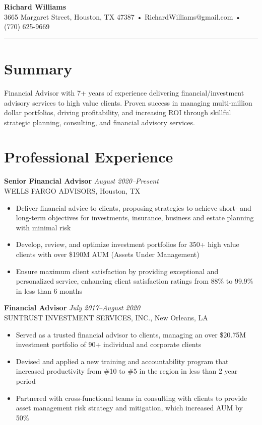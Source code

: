 \documentclass[11pt,letterpaper]{article}
\newcommand{\header}[1]{\textbf{\color{headercolor}#1}}
\begin{document}
\begin{center}
{\fontsize{24}{28}\selectfont\bfseries\color{headercolor} Richard Williams}\\[0.5em]
3665 Margaret Street, Houston, TX 47387 • RichardWilliams@gmail.com • (770) 625-9669
\end{center}
\noindent\rule{\textwidth}{2pt}
\section*{Summary}
Financial Advisor with 7+ years of experience delivering financial/investment advisory services to high value clients. Proven success in managing multi-million dollar portfolios, driving profitability, and increasing ROI through skillful strategic planning, consulting, and financial advisory services.
\section*{Professional Experience}
\vspace{0.3em}
\header{Senior Financial Advisor} \hfill \hfill \textit {August 2020--Present}\\
WELLS FARGO ADVISORS, Houston, TX
\begin{itemize}[leftmargin=2em,itemsep=0.3ex]
  \item Deliver financial advice to clients, proposing strategies to achieve short- and long-term objectives for investments, insurance, business and estate planning with minimal risk
  \item Develop, review, and optimize investment portfolios for 350+ high value clients with over \$190M AUM (Assets Under Management)
  \item Ensure maximum client satisfaction by providing exceptional and personalized service, enhancing client satisfaction ratings from 88\% to 99.9\% in less than 6 months
\end{itemize}
\vspace{0.4em}
\header{Financial Advisor} \hfill \hfill \textit {July 2017--August 2020}\\
SUNTRUST INVESTMENT SERVICES, INC., New Orleans, LA
\begin{itemize}[leftmargin=2em,itemsep=0.3ex]
  \item Served as a trusted financial advisor to clients, managing an over \$20.75M investment portfolio of 90+ individual and corporate clients
  \item Devised and applied a new training and accountability program that increased productivity from \#10 to \#5 in the region in less than 2 year period
  \item Partnered with cross-functional teams in consulting with clients to provide asset management risk strategy and mitigation, which increased AUM by 50\%
\end{itemize}
\end{document}
